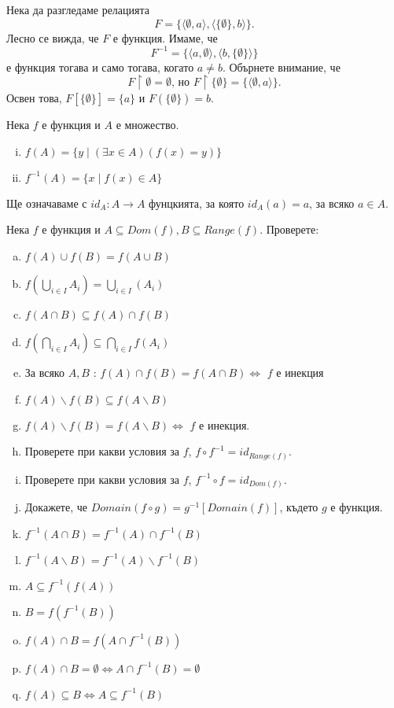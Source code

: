 \begin{example}
  Нека да разгледаме релацията \[F = \{\langle{\emptyset, a}\rangle,\langle{\{\emptyset\}, b}\rangle\}.\]
  Лесно се вижда, че $F$ е функция.
  Имаме, че \[F^{-1} = \{\langle{a,\emptyset}\rangle,\langle{b, \{\emptyset\}}\rangle\}\] е функция тогава и само тогава, когато  $a\neq b$.
  Обърнете внимание, че
  \[F\upharpoonright{\emptyset} = \emptyset \mbox{, но } F\upharpoonright\{\emptyset\} = \{\langle{\emptyset,a}\rangle\}.\]
  Освен това, $F[\{\emptyset\}] = \{a\}$ и $F(\{\emptyset\}) = b$.
\end{example}

  Нека $f$ е функция и $A$ е множество.
  \begin{enumerate}[(i)]
  \item
    $f(A) = \{y \mid (\exists x\in A)(f(x) = y)\}$
  \item
    $f^{-1}(A) = \{x \mid f(x)\in A\}$
  \end{enumerate}
  

Ще означаваме с $id_A:A\to A$ фунцкията, за която $id_A(a) = a$, за всяко $a\in A$.
\begin{problem}
  Нека $f$ е функция и $A\subseteq Dom(f), B\subseteq Range(f)$.
  Проверете:
  \begin{enumerate}[a)]
  \item
    $f(A)\cup f(B) = f(A\cup B)$
  \item
    $f(\bigcup_{i\in I}A_i) = \bigcup_{i\in I}(A_i)$
  \item
    $f(A\cap B)\subseteq f(A)\cap f(B)$
  \item
    $f(\bigcap_{i\in I}A_i) \subseteq \bigcap_{i\in I}f(A_i)$
  \item
    За всяко $A,B$ : $f(A)\cap f(B) = f(A\cap B) \iff$
    $f$ е инекция
  \item
    $f(A)\backslash f(B)\subseteq f(A\backslash B)$
  \item
    $f(A)\backslash f(B) = f(A\backslash B) \iff$
    $f$ е инекция.
  \item
    Проверете при какви условия за $f$, $f\circ f^{-1} = id_{Range(f)}$.
  \item
    Проверете при какви условия за $f$, $f^{-1}\circ f = id_{Dom(f)}$.
  \item
    Докажете, че $Domain(f\circ g) = g^{-1}[Domain(f)]$, където $g$ е функция.
  \item
    $f^{-1}(A\cap B) = f^{-1}(A)\cap f^{-1}(B)$
  \item
    $f^{-1}(A\backslash B) = f^{-1}(A)\backslash f^{-1}(B)$
  \item
    $A\subseteq f^{-1}(f(A))$
  \item
    $B = f(f^{-1}(B))$
  \item
    $f(A)\cap B = f(A\cap f^{-1}(B))$
  \item
    $f(A)\cap B = \emptyset \iff A\cap f^{-1}(B) = \emptyset$
  \item
    $f(A)\subseteq B \iff A\subseteq f^{-1}(B)$
  \end{enumerate}
\end{problem}



